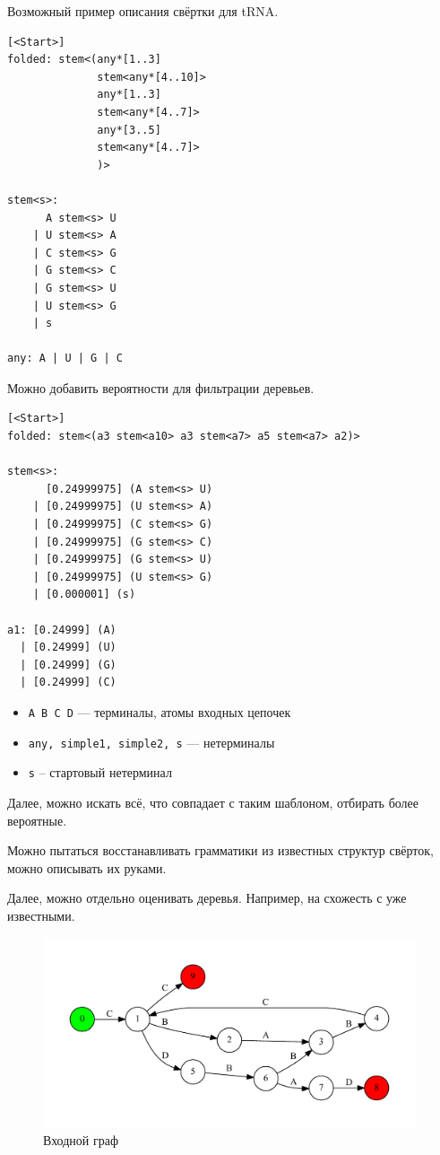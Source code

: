 \documentclass[a5paper]{article}
\begin{document}
Возможный пример описания свёртки для tRNA.

\begin{verbatim}
[<Start>]
folded: stem<(any*[1..3] 
              stem<any*[4..10]> 
              any*[1..3] 
              stem<any*[4..7]> 
              any*[3..5] 
              stem<any*[4..7]>
              )>

stem<s>: 
      A stem<s> U
    | U stem<s> A
    | C stem<s> G
    | G stem<s> C
    | G stem<s> U
    | U stem<s> G
    | s

any: A | U | G | C

\end{verbatim}

Можно добавить вероятности для фильтрации деревьев.

\begin{verbatim}
[<Start>]
folded: stem<(a3 stem<a10> a3 stem<a7> a5 stem<a7> a2)>

stem<s>: 
      [0.24999975] (A stem<s> U)
    | [0.24999975] (U stem<s> A)
    | [0.24999975] (C stem<s> G)
    | [0.24999975] (G stem<s> C)
    | [0.24999975] (G stem<s> U)
    | [0.24999975] (U stem<s> G)
    | [0.000001] (s)

a1: [0.24999] (A)
  | [0.24999] (U)
  | [0.24999] (G)
  | [0.24999] (C)
\end{verbatim}


\begin{itemize}
\item \texttt{A B C D} --- терминалы, атомы входных цепочек
\item \texttt{any, simple1, simple2, s} --- нетерминалы
\item \texttt{s} -- стартовый нетерминал
\end{itemize}

Далее, можно искать всё, что совпадает с таким шаблоном, отбирать более вероятные.


Можно пытаться восстанавливать грамматики из известных структур свёрток, можно описывать их руками.

Далее, можно отдельно оценивать деревья. Например, на схожесть с уже известными.
\begin{figure}[H]
    \begin{center}
        \includegraphics[width=11cm]{input.pdf}
        \caption{Входной граф}
        \label{pic1}        
    \end{center}
\end{figure}
\end{document}
